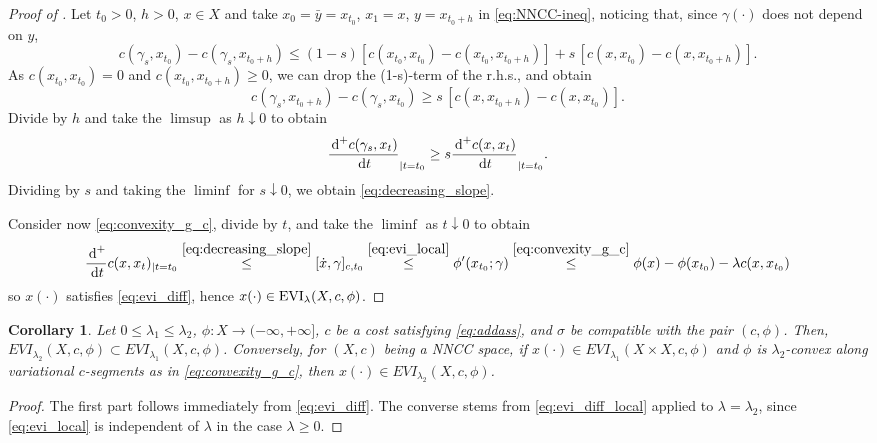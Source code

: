 \documentclass[reqno]{amsart}
\newcounter{results}[section]
\theoremstyle{plain}
\newtheorem{corollary}[results]{Corollary}
\theoremstyle{remark}
\theoremstyle{plain}
\numberwithin{equation}{section}
\theoremstyle{remark}
\newcommand{\y}{\bar y}
\newcommand{\de}{{\,\rm d}}
\DeclareMathOperator{\EVI}{{\rm EVI}}
\begin{document}
\begin{proof}[Proof of ] Let $t_0>0$, $h>0$, $x\in X$ and take $x_0=\y=x_{t_0}$, $x_1=x$, $y=x_{t_0+h}$ in \eqref{eq:NNCC-ineq}, noticing that, since $\gamma(\cdot)$ does not depend on $y$,
    \begin{equation*}
        c(\gamma_s,x_{t_0})-c(\gamma_s,x_{t_0+h})\leq (1-s)[c(x_{t_0},x_{t_0})-c(x_{t_0},x_{t_0+h})] + s \,[c(x,x_{t_0})-c(x,x_{t_0+h})].
    \end{equation*} 
    As $c(x_{t_0},x_{t_0})=0$ and $c(x_{t_0},x_{t_0+h})\ge 0$, we can  drop  the  (1-s)-term  of the r.h.s., and obtain
    \begin{equation*}
        c(\gamma_s,x_{t_0+h}) - c(\gamma_s,x_{t_0})\geq s \,[c(x,x_{t_0+h})-c(x,x_{t_0})].
    \end{equation*}
    Divide by $h$ and take the  $\limsup$ as $h\downarrow 0$  to obtain
    \begin{equation}
        \frac{\de^+ c(\gamma_s, x_t)}{\de t}_{|t=t_0}\geq s \frac{\de^+ c(x, x_t)}{\de t}_{|t=t_0}  . 
    \end{equation}
    Dividing by $s$ and taking the $\liminf$  for $s\downarrow 0$,  we obtain \eqref{eq:decreasing_slope}. 

    Consider now  \eqref{eq:convexity_g_c}, divide by $t$, and take the   $\liminf$ as  $t\downarrow 0$ to obtain
    \begin{equation}\label{eq:evi_diff_local}
       \frac{\de^+}{\de t} c(x, x_t)_{|t=t_0}\stackrel{\eqref{eq:decreasing_slope}}{\le}  [\dot x, \gamma]_{c,t_0} \stackrel{\eqref{eq:evi_local}}{\le}\phi'(x_{ t_0};\gamma)  \stackrel{\eqref{eq:convexity_g_c}}{\le} \phi(x)-\phi(x_{t_0})-\lambda c(x, x_{t_0})
    \end{equation}
    so $x(\cdot)$ satisfies \eqref{eq:evi_diff},  hence $x(\cdot) \in  \EVI_\lambda(X,c,\phi)$.
\end{proof}

\begin{corollary}   Let $0\le \lambda_1 \le \lambda_2$, $\phi:X\to (-\infty, + \infty]$, $c$ be a cost satisfying \eqref{eq:addass}, and $\sigma$ be compatible with the pair $(c,\phi)$.  Then, $EVI_{\lambda_2}(X,c,\phi)\subset EVI_{\lambda_1}(X,c,\phi)$. 
Conversely, for $(X,c)$  being a   NNCC space, if $x(\cdot) \in  EVI_{\lambda_1}(X \times X,c,\phi)$ and $\phi$ is $\lambda_2$-convex along variational $c$-segments as in \eqref{eq:convexity_g_c}, then $x(\cdot) \in  EVI_{\lambda_2}(X,c,\phi)$.
\end{corollary}
\begin{proof}
    The first part  follows immediately from  \eqref{eq:evi_diff}. The converse stems from \eqref{eq:evi_diff_local} applied to $\lambda=\lambda_2$, since \eqref{eq:evi_local}  is independent of $\lambda$ in the case $\lambda \geq 0$.  
\end{proof}
\end{document}
